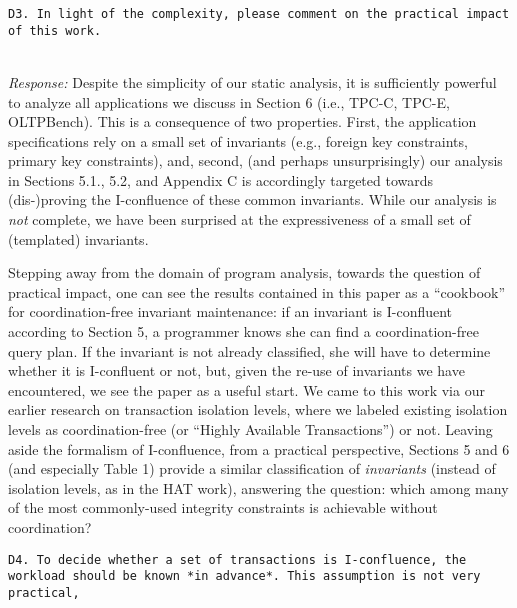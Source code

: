 \documentclass[10pt]{article}
\newcommand{\reviewer}[1] {\noindent\colorbox{reviewercolor}{\parbox{\textwidth}{\noindent\texttt{#1}}}\\}
\newcommand{\response}[1] {\noindent\textit{Response: } #1\\}
\begin{document}
\reviewer{D3. In light of the complexity, please comment on the practical 
  impact of this work.}

\response{Despite the simplicity of our static analysis, it is
  sufficiently powerful to analyze all applications we discuss in
  Section 6 (i.e., TPC-C, TPC-E, OLTPBench). This is a consequence of
  two properties. First, the application specifications rely on a
  small set of invariants (e.g., foreign key constraints, primary key
  constraints), and, second, (and perhaps unsurprisingly) our analysis
  in Sections 5.1., 5.2, and Appendix C is accordingly targeted
  towards (dis-)proving the I-confluence of these common
  invariants. While our analysis is \textit{not} complete, we have
  been surprised at the expressiveness of a small set of (templated)
  invariants.

  Stepping away from the domain of program analysis, towards the
  question of practical impact, one can see the results contained in
  this paper as a ``cookbook'' for coordination-free invariant
  maintenance: if an invariant is I-confluent according to Section 5,
  a programmer knows she can find a coordination-free query plan. If
  the invariant is not already classified, she will have to determine
  whether it is I-confluent or not, but, given the re-use of
  invariants we have encountered, we see the paper as a useful
  start. We came to this work via our earlier research on transaction
  isolation levels, where we labeled existing isolation levels as
  coordination-free (or ``Highly Available Transactions'') or
  not. Leaving aside the formalism of I-confluence, from a practical
  perspective, Sections 5 and 6 (and especially Table 1) provide a
  similar classification of \textit{invariants} (instead of isolation
  levels, as in the HAT work), answering the question: which among
  many of the most commonly-used integrity constraints is achievable without
  coordination?}

\reviewer{D4. To decide whether a set of transactions is I-confluence, the workload should be known *in advance*. This assumption is not very practical,}
\end{document}
